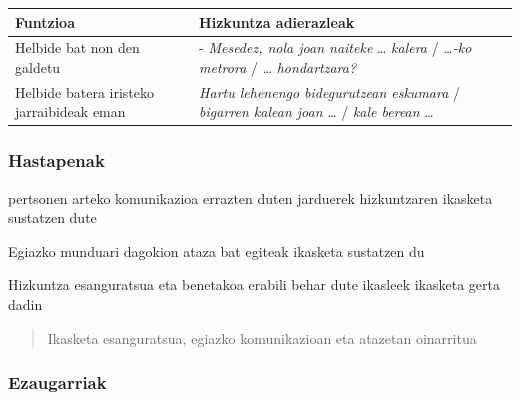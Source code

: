 \documentclass[
]{book}
\providecommand{\tightlist}{%
  \setlength{\itemsep}{0pt}\setlength{\parskip}{0pt}}
\begin{document}
\begin{longtable}[]{@{}
  >{\raggedright\arraybackslash}p{}
  >{\raggedright\arraybackslash}p{}@{}}
\toprule
Funtzioa & Hizkuntza adierazleak \\
\midrule
\endhead
Helbide bat non den galdetu & - \emph{Mesedez, nola joan naiteke} \ldots{} \emph{kalera} / \ldots{}\emph{-ko metrora} / \ldots{} \emph{hondartzara?} \\
Helbide batera iristeko jarraibideak eman & \emph{Hartu lehenengo bidegurutzean eskumara} / \emph{bigarren kalean joan} \ldots{} / \emph{kale berean} \ldots{} \\
\bottomrule
\end{longtable}

\hypertarget{hastapenak}{%
\subsubsection{Hastapenak}\label{hastapenak}}

\begin{description}
\tightlist
\item[Komunikazioa]
pertsonen arteko komunikazioa errazten duten jarduerek hizkuntzaren ikasketa sustatzen dute
\item[Ataza]
Egiazko munduari dagokion ataza bat egiteak ikasketa sustatzen du
\item[Esanguratsua]
Hizkuntza esanguratsua eta benetakoa erabili behar dute ikasleek ikasketa gerta dadin
\end{description}

\begin{quote}
Ikasketa esanguratsua, egiazko komunikazioan eta atazetan oinarritua
\end{quote}

\hypertarget{ezaugarriak}{%
\subsubsection{Ezaugarriak}\label{ezaugarriak}}
\end{document}
